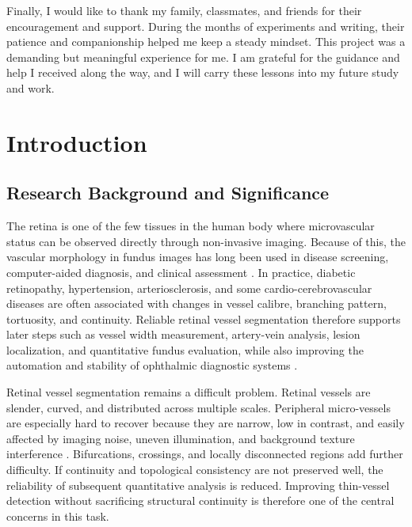 \documentclass[a4paper,11pt]{article}
\begin{document}
Finally, I would like to thank my family, classmates, and friends for their encouragement and support. During the months of experiments and writing, their patience and companionship helped me keep a steady mindset. This project was a demanding but meaningful experience for me. I am grateful for the guidance and help I received along the way, and I will carry these lessons into my future study and work.

\clearpage
\tableofcontents
\clearpage
\listoffigures
\clearpage
\listoftables
\clearpage

\section{Introduction}

\subsection{Research Background and Significance}

The retina is one of the few tissues in the human body where microvascular status can be observed directly through non-invasive imaging. Because of this, the vascular morphology in fundus images has long been used in disease screening, computer-aided diagnosis, and clinical assessment \cite{staal2004drive,hoover2000locating}. In practice, diabetic retinopathy, hypertension, arteriosclerosis, and some cardio-cerebrovascular diseases are often associated with changes in vessel calibre, branching pattern, tortuosity, and continuity. Reliable retinal vessel segmentation therefore supports later steps such as vessel width measurement, artery-vein analysis, lesion localization, and quantitative fundus evaluation, while also improving the automation and stability of ophthalmic diagnostic systems \cite{fraz2012ensemble,budai2013robust}.

Retinal vessel segmentation remains a difficult problem. Retinal vessels are slender, curved, and distributed across multiple scales. Peripheral micro-vessels are especially hard to recover because they are narrow, low in contrast, and easily affected by imaging noise, uneven illumination, and background texture interference \cite{staal2004drive,hoover2000locating}. Bifurcations, crossings, and locally disconnected regions add further difficulty. If continuity and topological consistency are not preserved well, the reliability of subsequent quantitative analysis is reduced. Improving thin-vessel detection without sacrificing structural continuity is therefore one of the central concerns in this task.
\end{document}
